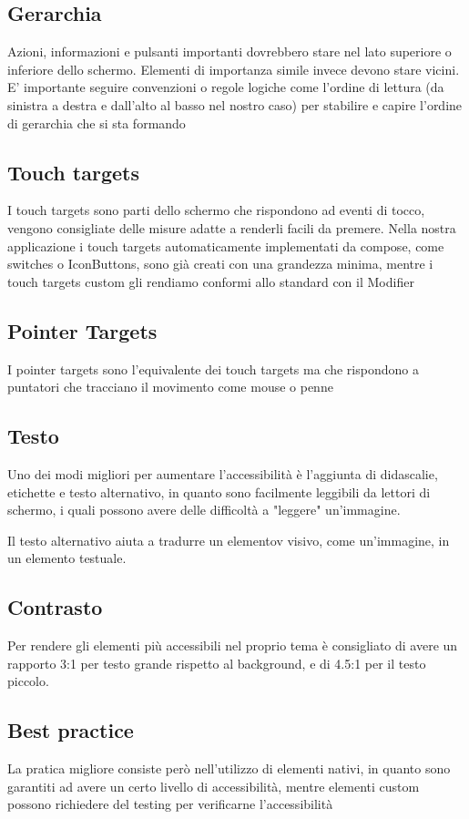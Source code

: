 \documentclass[12pt, a4paper]{report}
\begin{document}
		\subsection{Gerarchia}
			Azioni, informazioni e pulsanti importanti dovrebbero stare nel lato superiore o inferiore dello schermo.
			Elementi di importanza simile invece devono stare vicini. E' importante seguire convenzioni o regole logiche come l'ordine di lettura (da sinistra a destra e dall'alto al basso nel nostro caso) per stabilire e capire l'ordine di gerarchia che si sta formando
		\subsection{Touch targets}
			I touch targets sono parti dello schermo che rispondono ad eventi di tocco, vengono consigliate delle misure adatte a renderli facili da premere. Nella nostra applicazione i touch targets automaticamente implementati da compose, come switches o IconButtons, sono già creati con una grandezza minima,
			mentre i touch targets custom gli rendiamo conformi allo standard con il Modifier
		\subsection{Pointer Targets}
			I pointer targets sono l'equivalente dei touch targets ma che rispondono a puntatori che tracciano il movimento come mouse o penne
		\subsection{Testo}
			Uno dei modi migliori per aumentare l'accessibilità è l'aggiunta di didascalie, etichette e testo alternativo, in quanto sono facilmente leggibili da lettori di schermo, i quali possono avere delle difficoltà a "leggere" un'immagine.
			
			Il testo alternativo aiuta a tradurre un elementov visivo, come un'immagine, in un elemento testuale.
		\subsection{Contrasto}
			Per rendere gli elementi più accessibili nel proprio tema è consigliato di avere un rapporto 3:1 per testo grande rispetto al background, e di 4.5:1 per il testo piccolo.

		\subsection{Best practice}
			La pratica migliore consiste però nell'utilizzo di elementi nativi, in quanto sono garantiti ad avere un certo livello di accessibilità, mentre elementi custom possono richiedere del testing per verificarne l'accessibilità
\end{document}
